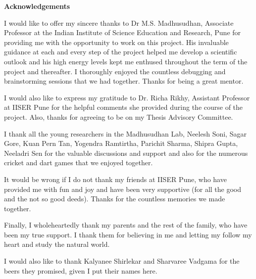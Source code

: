 \begin{titlepage}
\begin{center}
{\huge \bfseries Acknowledgements}\\[1.5cm]
\end{center}
I would like to offer my sincere thanks to Dr M.S. Madhusudhan, Associate Professor at the Indian Institute of Science Education and Research, Pune for providing me with the opportunity to work on this project. His invaluable guidance at each and every step of the project helped me develop a scientific outlook and his high energy levels kept me enthused throughout the term of the project and thereafter. I thoroughly enjoyed the countless debugging and brainstorming sessions that we had together. Thanks for being a great mentor.
\par
I would also like to express my gratitude to Dr. Richa Rikhy, Assistant Professor at IISER Pune for the helpful comments she provided during the course of the project. Also, thanks for agreeing to be on my Thesis Advisory Committee.
\par
I thank all the young researchers in the Madhusudhan Lab, Neelesh Soni, Sagar Gore, Kuan Pern Tan, Yogendra Ramtirtha, Parichit Sharma, Shipra Gupta, Neeladri Sen for the valuable discussions and support and also for the numerous cricket and dart games that we enjoyed together.
\par
It would be wrong if I do not thank my friends at IISER Pune, who have provided me with fun and joy and have been very supportive (for all the good and the not so good deeds). Thanks for the countless memories we made together.
\par
Finally, I wholeheartedly thank my parents and the rest of the family, who have been my true support. I thank them for believing in me and letting my follow my heart and study the natural world.
\par
I would also like to thank Kalyanee Shirlekar and Sharvaree Vadgama for the beers they promised, given I put their names here.
\vfill %
\end{titlepage}
